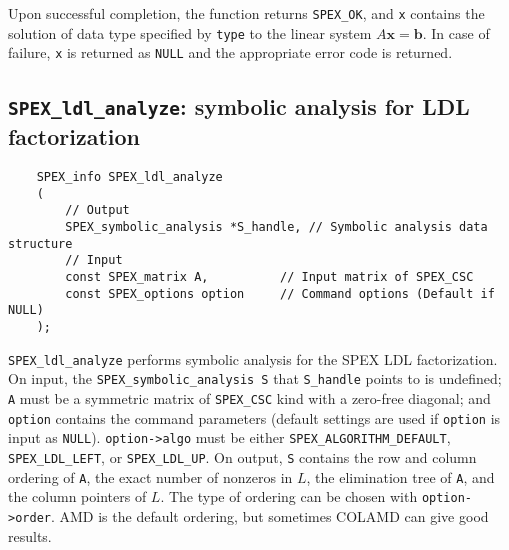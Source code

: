 \documentclass[12pt,oneside]{book}
\theoremstyle{definition}
\renewcommand{\b}{\mathbf{b}}
\newcommand{\x}{\mathbf{x}}
\begin{document}
Upon successful completion, the function returns \verb|SPEX_OK|, and
\verb|x| contains the solution of data type specified by
\verb|type| to the linear system $A \x=\b$. In case of failure, \verb|x| is returned as \verb|NULL| and the appropriate error code is returned.

\subsection{\texttt{SPEX\_ldl\_analyze}: symbolic analysis for LDL factorization} \label{ss:spex_ldl_analyze}
\begin{mdframed}[userdefinedwidth=\textwidth]
{\footnotesize
\begin{verbatim}
    SPEX_info SPEX_ldl_analyze
    (
        // Output
        SPEX_symbolic_analysis *S_handle, // Symbolic analysis data structure 
        // Input
        const SPEX_matrix A,          // Input matrix of SPEX_CSC
        const SPEX_options option     // Command options (Default if NULL)
    );
    \end{verbatim}
} \end{mdframed}

\verb|SPEX_ldl_analyze| performs symbolic analysis for the SPEX LDL factorization. On input, the \verb|SPEX_symbolic_analysis S| that  \verb|S_handle| points to is undefined;  \verb|A| must be a symmetric matrix of \verb|SPEX_CSC| kind with a zero-free diagonal;  and \verb|option| contains the command parameters  (default settings are used if
\verb|option| is input as \verb|NULL|). 
\verb|option->algo| must be either 
\verb|SPEX_ALGORITHM_DEFAULT|, \verb|SPEX_LDL_LEFT|, or \verb|SPEX_LDL_UP|.
On output, \verb|S| contains the row and column ordering of \verb|A|, the exact number of nonzeros in $L$, the elimination tree of \verb|A|, and the column pointers of $L$. The type of ordering can be chosen with \verb|option->order|. 
AMD is the default ordering, but sometimes COLAMD can give good results.

\end{document}
